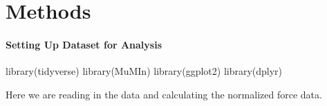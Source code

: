 \documentclass[
]{article}
\newenvironment{Shaded}{\begin{snugshade}}{\end{snugshade}}
\newcommand{\FunctionTok}[1]{\textcolor[rgb]{0.00,0.00,0.00}{#1}}
\newcommand{\NormalTok}[1]{#1}
\begin{document}
\hypertarget{methods}{%
\section{Methods}\label{methods}}

\hypertarget{setting-up-dataset-for-analysis}{%
\paragraph{Setting Up Dataset for
Analysis}\label{setting-up-dataset-for-analysis}}

\begin{Shaded}
\begin{Highlighting}[]
\FunctionTok{library}\NormalTok{(tidyverse)}
\FunctionTok{library}\NormalTok{(MuMIn)}
\FunctionTok{library}\NormalTok{(ggplot2)}
\FunctionTok{library}\NormalTok{(dplyr)}
\end{Highlighting}
\end{Shaded}

Here we are reading in the data and calculating the normalized force
data.
\end{document}
